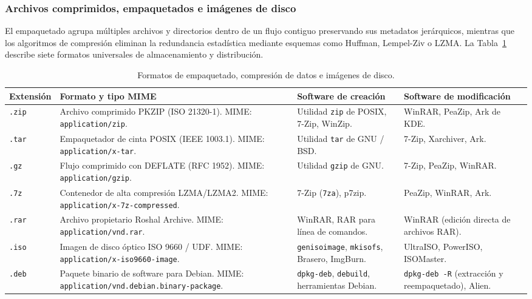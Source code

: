 \documentclass[12pt]{article}
\begin{document}
\subsubsection{Archivos comprimidos, empaquetados e imágenes de disco}
El empaquetado agrupa múltiples archivos y directorios dentro de un flujo contiguo preservando sus metadatos jerárquicos, mientras que los algoritmos de compresión eliminan la redundancia estadística mediante esquemas como Huffman, Lempel-Ziv o LZMA. La Tabla~\ref{tab:formatosEmpaquetado} describe siete formatos universales de almacenamiento y distribución.

\begin{table}[H]
\centering
\scriptsize
\renewcommand{\arraystretch}{0.95}
\renewcommand{\tabularxcolumn}[1]{m{#1}}
\setlength{\emergencystretch}{2em}
\caption{Formatos de empaquetado, compresión de datos e imágenes de disco.}
\label{tab:formatosEmpaquetado}
\begin{tabularx}{\textwidth}{>{\centering\arraybackslash}m{1.8cm} X X X}
\toprule
\textbf{Extensión} & \textbf{Formato y tipo MIME} & \textbf{Software de creación} & \textbf{Software de modificación} \\
\midrule
\texttt{.zip} & Archivo comprimido PKZIP (ISO 21320-1). MIME: \texttt{application/zip}. & Utilidad \texttt{zip} de POSIX, 7-Zip, WinZip. & WinRAR, PeaZip, Ark de KDE. \\
\texttt{.tar} & Empaquetador de cinta POSIX (IEEE 1003.1). MIME: \texttt{application/x-tar}. & Utilidad \texttt{tar} de GNU / BSD. & 7-Zip, Xarchiver, Ark. \\
\texttt{.gz} & Flujo comprimido con DEFLATE (RFC 1952). MIME: \texttt{application/gzip}. & Utilidad \texttt{gzip} de GNU. & 7-Zip, PeaZip, WinRAR. \\
\texttt{.7z} & Contenedor de alta compresión LZMA/LZMA2. MIME: \texttt{application/\allowbreak x-7z-compressed}. & 7-Zip (\texttt{7za}), p7zip. & PeaZip, WinRAR, Ark. \\
\texttt{.rar} & Archivo propietario Roshal Archive. MIME: \texttt{application/vnd.rar}. & WinRAR, RAR para línea de comandos. & WinRAR (edición directa de archivos RAR). \\
\texttt{.iso} & Imagen de disco óptico ISO 9660 / UDF. MIME: \texttt{application/\allowbreak x-iso9660-image}. & \texttt{genisoimage}, \texttt{mkisofs}, Brasero, ImgBurn. & UltraISO, PowerISO, ISOMaster. \\
\texttt{.deb} & Paquete binario de software para Debian. MIME: \texttt{application/\allowbreak vnd.debian.\allowbreak binary-package}. & \texttt{dpkg-deb}, \texttt{debuild}, herramientas Debian. & \texttt{dpkg-deb -R} (extracción y reempaquetado), Alien. \\
\bottomrule
\end{tabularx}
\end{table}
\end{document}
